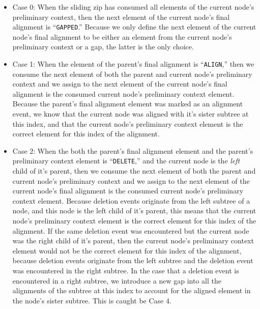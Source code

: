 \documentclass{bmcart}
\begin{document}
\begin{itemize}

  \item Case 0: When the sliding zip has consumed all elements of the current node's preliminary context, then the next element of the current node's final alignment is ``\texttt{GAPPED}.''
  Because we only define the next element of the current node's final alignment to be either an element from the current node's preliminary context or a gap, the latter is the only choice.

  \item Case 1: When the element of the parent's final alignment is ``\texttt{ALIGN},'' then we consume the next element of both the parent and current node's preliminary context and we assign to the next element of the current node's final alignment is the consumed current node's preliminary context element.
  Because the parent's final alignment element was marked as an alignment event, we know that the current node was aligned with it's sister subtree at this index, and that the current node's preliminary context element is the correct element for this index of the alignment.
  
  \item Case 2: When the both the parent's final alignment element and the parent's preliminary context element is ``\texttt{DELETE},'' and the current node is the \textit{left} child of it's parent, then we consume the next element of both the parent and current node's preliminary context and we assign to the next element of the current node's final alignment is the consumed current node's preliminary context element.
  Because deletion events originate from the left subtree of a node, and this node is the left child of it's parent, this means that the current node's preliminary context element is the correct element for this index of the alignment.
  If the same deletion event was encountered but the current node was the right child of it's parent, then the current node's preliminary context element would not be the correct element for this index of the alignment, because deletion events originate from the left subtree and the deletion event was encountered in the right subtree.
  In the case that a deletion event is encountered in a right subtree, we introduce a new gap into all the alignments of the subtree at this index to account for the aligned element in the node's sister subtree.
  This is caught be Case 4.
  

\end{itemize}
\end{document}
